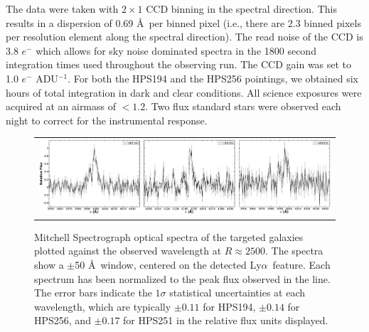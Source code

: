 \documentclass{emulateapj}
\newcommand{\lya}{Ly$\alpha$}
\begin{document}
The data were taken with $2\times1$ CCD binning in the spectral direction. This results in a dispersion of 0.69 \AA\ per binned pixel (i.e., there are 2.3 binned pixels per resolution element along the spectral direction). The read noise of the CCD is 3.8 $e^{-}$ which allows for sky noise dominated spectra in the 1800 second integration times used throughout the observing run. The CCD gain was set to 1.0 $e^{-}$ ADU$^{-1}$.  For both the HPS194 and the HPS256 pointings, we obtained six hours of total integration in dark and clear conditions. All science exposures were acquired at an airmass of $<1.2$. Two flux standard stars were observed each night to correct for the instrumental response.   

	\begin{figure}[t]
	\begin{center}
	\begin{tabular}{c}
	\includegraphics[width=17cm]{f2.png}
	\end{tabular}
	\end{center}
	\caption[example] 
	{ \label{fig:CalSpec} 
	Mitchell Spectrograph optical spectra of the targeted galaxies plotted against the observed wavelength at $R\approx2500$. The spectra show a $\pm$50 \AA\ window, centered on the detected \lya\ feature. Each spectrum has been normalized to the peak flux observed in the line. The error bars indicate the $1\sigma$ statistical uncertainties at each wavelength, which are typically $\pm0.11$ for HPS194, $\pm0.14$ for HPS256, and $\pm0.17$ for HPS251 in the relative flux units displayed.}
	\end{figure} 
\end{document}
